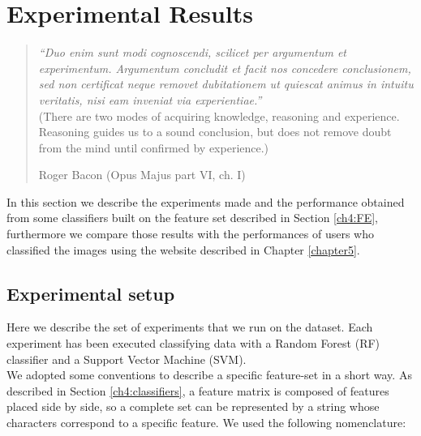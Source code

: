 \chapter{Experimental Results}
\label{chapter6}
\thispagestyle{empty}

\begin{quotation}
{\footnotesize
\noindent \emph{\textquotedblleft  Duo enim sunt modi cognoscendi, scilicet per argumentum et experimentum. Argumentum concludit et facit nos
concedere conclusionem, sed non certificat neque removet dubitationem ut quiescat animus in intuitu veritatis, nisi eam inveniat via experientiae.\textquotedblright}\\
\noindent (There are two modes of acquiring knowledge, reasoning and experience. Reasoning guides us to a sound conclusion, but does not remove doubt from the mind until
confirmed by experience.)
\begin{flushright}
Roger Bacon (Opus Majus part VI, ch. I)
\end{flushright}
}
\end{quotation}
\vspace{0.5cm}


In this section we describe the experiments made and the performance obtained from some classifiers built on the feature set described in Section \ref{ch4:FE},
furthermore we compare those results with the performances of users who classified the images using the website described in Chapter \ref{chapter5}.

\vspace{0.5cm}

\section{Experimental setup}

Here we describe the set of experiments that we run on the dataset. Each experiment has been executed classifying data with a Random Forest (\Gls{RF}) classifier and
a Support Vector Machine (\Gls{SVM}).\\
We adopted some conventions to describe a specific feature-set in a short way. As described in Section \ref{ch4:classifiers}, a feature matrix is composed of 
features placed side by side, so a complete set can be represented by a string whose characters correspond to a specific feature. We used the following nomenclature:


